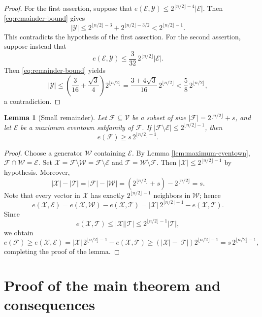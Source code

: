 \documentclass[11pt]{article}
\newtheorem{lemma}[theorem]{Lemma}
\begin{document}
\begin{proof}
For the first assertion, suppose that
\(e(\mathcal E,\mathcal Y) \le 2^{\lfloor n/2\rfloor-4}|\mathcal E|\).  Then
\eqref{eq:remainder-bound} gives
\[
 |\mathcal Y|
 \le
 2^{\lfloor n/2\rfloor-3}
 +
 2^{\lfloor n/2\rfloor-3/2}
 <
 2^{\lfloor n/2\rfloor-1}.
\]
This contradicts the hypothesis of the first assertion.
For the second assertion, suppose instead that
\[
 e(\mathcal E,\mathcal Y)
 \le
 \frac{3}{32}\,2^{\lfloor n/2\rfloor}|\mathcal E|.
\]
Then \eqref{eq:remainder-bound} yields
\[
 |\mathcal Y|
 \le
 \left(\frac{3}{16}+\frac{\sqrt3}{4}\right)2^{\lfloor n/2\rfloor}
 =
 \frac{3+4\sqrt3}{16}\,2^{\lfloor n/2\rfloor}
 <
 \frac58\,2^{\lfloor n/2\rfloor},
\]
a contradiction.
\end{proof}

\begin{lemma}[Small remainder]\label{lem:small-remainder}
Let \(\mathcal F\subseteq\mathcal V\) be a subset of size \(|\mathcal F|=2^{\lfloor n/2\rfloor}+s\), and let \(\mathcal E\) be a maximum eventown subfamily of \(\mathcal F\).
If \(|\mathcal F\setminus\mathcal E| \le 2^{\lfloor n/2\rfloor-1}\), then
\[
 e(\mathcal F)\ge s\,2^{\lfloor n/2\rfloor-1}.
\]
\end{lemma}

\begin{proof}
Choose a generator \(\mathcal W\) containing \(\mathcal E\).  By Lemma
\ref{lem:maximum-eventown},
\(\mathcal F\cap\mathcal W=\mathcal E\).  Set
\(\mathcal X=\mathcal F\setminus\mathcal W=\mathcal F\setminus\mathcal E\) and
\(\mathcal T=\mathcal W\setminus\mathcal F\).
Then \(|\mathcal X|\le 2^{\lfloor n/2\rfloor-1}\) by hypothesis. Moreover,
\[
 |\mathcal X|-|\mathcal T|=|\mathcal F|-|\mathcal W|=(2^{\lfloor n/2\rfloor}+s)-2^{\lfloor n/2\rfloor}=s.
\]
Note that every vector in \(\mathcal X\) has exactly
\(2^{\lfloor n/2\rfloor-1}\) neighbors in \(\mathcal W\); hence
\[
 e(\mathcal X,\mathcal E)
 =e(\mathcal X,\mathcal W)-e(\mathcal X,\mathcal T)=|\mathcal X|\,2^{\lfloor n/2\rfloor-1}
 -e(\mathcal X,\mathcal T).
\]
Since
\[
 e(\mathcal X,\mathcal T)
 \le
 |\mathcal X||\mathcal T|
 \le
 2^{\lfloor n/2\rfloor-1}|\mathcal T|,
\]
we obtain
\[
 e(\mathcal F)
 \ge
 e(\mathcal X,\mathcal E)
 =|\mathcal X|\,2^{\lfloor n/2\rfloor-1}
 -e(\mathcal X,\mathcal T)
 \ge
 (|\mathcal X|-|\mathcal T|)
 2^{\lfloor n/2\rfloor-1}
 =
 s\,2^{\lfloor n/2\rfloor-1},
\]
completing the proof of the lemma.
\end{proof}

\section{Proof of the main theorem and consequences}\label{sec:main-proof}
\end{document}
